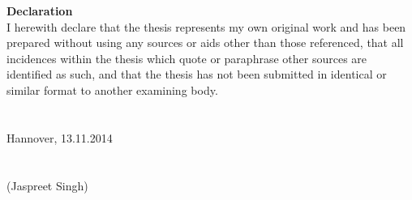 \begin{titlepage}
  

  \noindent \textbf{Declaration}\\

  \noindent I herewith declare that the thesis represents my own original
work and has been prepared without using any sources or aids other
than those referenced, that all incidences within the thesis which
quote or paraphrase other sources are identified as such, and that the
thesis has not been submitted in identical or similar format to
another examining body.
\\\\\\


  \noindent Hannover, 13.11.2014\\\\\\


  \noindent (Jaspreet Singh)

\end{titlepage}
    